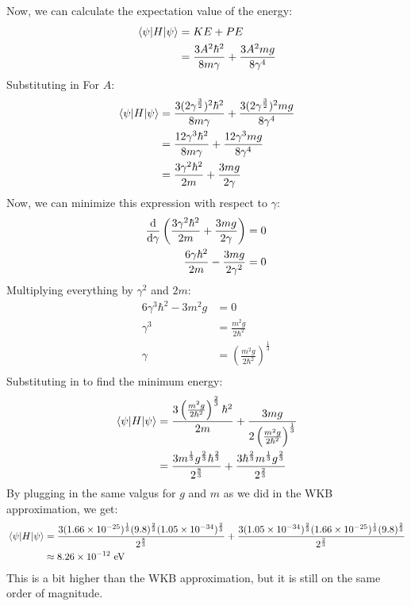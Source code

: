 \documentclass{article}[16pt]
\begin{document}
Now, we can calculate the expectation value of the energy:
\begin{align*}
    \expval{H}{\psi} &= KE + PE \\
    &= \frac{3A^2\hbar^2}{8m\gamma} + \frac{3A^2mg}{8\gamma^4} \\
\end{align*}
Substituting in For $A$:
\begin{align*}
    \expval{H}{\psi} &= \frac{3(2\gamma^{\frac{3}{2}})^2\hbar^2}{8m\gamma} + \frac{3(2\gamma^{\frac{3}{2}})^2mg}{8\gamma^4} \\
    &= \frac{12\gamma ^{3}\hbar^{2}}{8m\gamma} + \frac{12\gamma ^{3}mg}{8\gamma^4} \\
    &= \frac{3\gamma ^{2}\hbar^{2}}{2m} + \frac{3mg}{2\gamma} \\
\end{align*}
Now, we can minimize this expression with respect to $\gamma$:
\begin{align*}
    \dv{\gamma} \left(\frac{3\gamma ^{2}\hbar^{2}}{2m} + \frac{3mg}{2\gamma}\right) &= 0 \\
    \frac{6\gamma \hbar^{2}}{2m} - \frac{3mg}{2\gamma^2} &= 0 \\
\end{align*}
Multiplying everything by $\gamma^2$ and $2m$:
\begin{align*}
    6\gamma^3 \hbar^2 - 3m^2g &= 0 \\
    \gamma^3 &= \frac{m^2g}{2\hbar^2} \\
    \gamma &= \left(\frac{m^2g}{2\hbar^2}\right)^{\frac{1}{3}} \\
\end{align*}
Substituting in to find the minimum energy:
\begin{align*}
    \expval{H}{\psi} &= \frac{3\left(\frac{m^2g}{2\hbar^2}\right)^{\frac{2}{3}}\hbar^{2}}{2m} + \frac{3mg}{2\left(\frac{m^2g}{2\hbar^2}\right)^{\frac{1}{3}}} \\
    &= \frac{3m^{\frac{1}{3}}g^{\frac{2}{3}}\hbar^{\frac{2}{3}}}{2^\frac{8}{3}} + \frac{3\hbar^{\frac{2}{3}}m^{\frac{1}{3}}g^{\frac{2}{3}}}{2^\frac{2}{3}} \\
\end{align*}
By plugging in the same valgus for $g$ and $m$ as we did in the WKB approximation, we get:
\begin{align*}
    \expval{H}{\psi} &= \frac{3(1.66 \times 10^{-25})^{\frac{1}{3}}(9.8)^{\frac{2}{3}}(1.05 \times 10^{-34})^{\frac{2}{3}}}{2^\frac{8}{3}} + \frac{3(1.05 \times 10^{-34})^{\frac{2}{3}}(1.66 \times 10^{-25})^{\frac{1}{3}}(9.8)^{\frac{2}{3}}}{2^\frac{2}{3}} \\
    &\approx 8.26 \times 10^{-12} \text{ eV}
\end{align*}
This is a bit higher than the WKB approximation, but it is still on the same order of magnitude.
\end{document}
